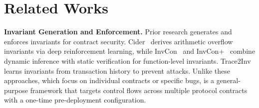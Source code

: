 \vspace{-1mm}
\section{Related Works} \label{sec:related}


\noindent
\textbf{Invariant Generation and Enforcement.}
Prior research generates and enforces invariants for contract security.
Cider~\cite{liu2022learning} derives arithmetic overflow invariants 
via deep reinforcement learning, 
while InvCon~\cite{liu2022invcon} and InvCon+~\cite{liu2024automated} 
combine dynamic inference with static verification for function-level invariants. 
Trace2Inv~\cite{chen2024demystifying} learns invariants from transaction 
history to prevent attacks. 
Unlike these approaches, which focus on individual 
contracts or specific bugs, {\name} is a general-purpose 
framework that
targets control 
flows across multiple protocol contracts with a one-time 
pre-deployment configuration.








